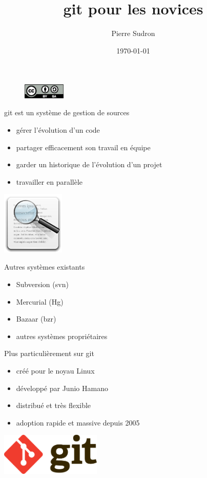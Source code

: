 \documentclass{beamer}
\author{Pierre Sudron}
\title{{\huge git pour les novices}}
\institute{Association Atilla}
\date{\today}
\begin{document}
\begin{frame}[t,plain]
\titlepage

\begin{figure}
	\begin{flushright}
	\includegraphics[width=2cm]{img/cc-by-sa}
	\end{flushright}
\end{figure}

\end{frame}

\begin{frame}{git est un système de gestion de sources}
	\begin{itemize}
		\item gérer l'évolution d'un code
		\item partager efficacement son travail en équipe
		\item garder un historique de l'évolution d'un projet
		\item travailler en parallèle
	\end{itemize}
	\begin{center}
		\includegraphics[width=3cm]{img/search}
	\end{center}
\end{frame}

\begin{frame}{Autres systèmes existants}
	\begin{itemize}
		\item Subversion (svn)
		\item Mercurial (Hg)
		\item Bazaar (bzr)
		\item autres systèmes propriétaires
	\end{itemize}
\end{frame}

\begin{frame}{Plus particulièrement sur git}
	\begin{itemize}
		\item créé pour le noyau Linux
		\item développé par Junio Hamano
		\item distribué et très flexible
		\item adoption rapide et massive depuis 2005
	\end{itemize}
	
	\begin{center}
		\includegraphics[height=2cm]{img/Git-logo}
	\end{center}	
\end{frame}
\end{document}
